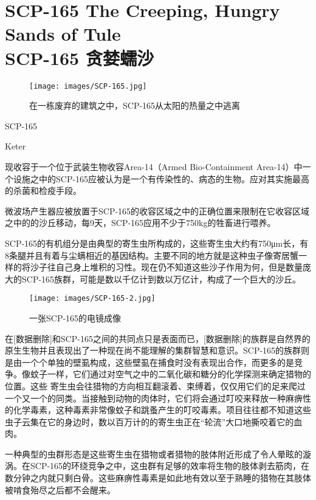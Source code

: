 \chapter[SCP-165 贪婪蠕沙]{
    SCP-165 The Creeping, Hungry Sands of Tule\\
    SCP-165 贪婪蠕沙
}

\label{chap:SCP-165}

\begin{figure}[H]
    \centering
    \texttt{[image: images/SCP-165.jpg]}
    \caption*{在一栋废弃的建筑之中，SCP-165从太阳的热量之中逃离}
\end{figure}

SCP-165

Keter

现收容于一个位于武装生物收容Area-14（Armed Bio-Containment Area-14）中一个设施之中的SCP-165应被认为是一个有传染性的、病态的生物。应对其实施最高的杀菌和检疫手段。

微波场产生器应被放置于SCP-165的收容区域之中的正确位置来限制在它收容区域之中的的沙丘移动，每9天，SCP-165应用不少于750kg的牲畜进行喂养。

\hr

SCP-165的有机组分是由典型的寄生虫所构成的，这些寄生虫大约有750μm长，有8条腿并且有着与尘螨相近的基因结构。主要不同的地方就是这种虫子像寄居蟹一样的将沙子往自己身上堆积的习性。现在仍不知道这些沙子作用为何，但是数量庞大的SCP-165族群，可能是数以千亿计到数以万亿计，构成了一个巨大的沙丘。

\begin{figure}[H]
    \centering
    \texttt{[image: images/SCP-165-2.jpg]}
    \caption*{一张SCP-165的电镜成像}
\end{figure}

在{[}数据删除]和SCP-165之间的共同点只是表面而已，{[}数据删除]的族群是自然界的原生生物并且表现出了一种现在尚不能理解的集群智慧和意识。SCP-165的族群则是由一个个单独的壁虱构成，这些壁虱在捕食时没有表现出合作，而更多的是竞争。像蚊子一样，它们通过对空气之中的二氧化碳和糖分的化学探测来确定猎物的位置。这些 寄生虫会往猎物的方向相互翻滚着、束缚着，仅仅用它们的足来爬过一个又一个的同类。当接触到动物的肉体时，它们将会通过叮咬来释放一种麻痹性的化学毒素，这种毒素非常像蚊子和跳蚤产生的叮咬毒素。项目往往都不知道这些虫子云集在它的身边时，数以百万计的的寄生虫正在“轮流”大口地撕咬着它的血肉。

一种典型的虫群形态是这些寄生虫在猎物或者猎物的肢体附近形成了令人晕眩的漩涡。在SCP-165的环绕竞争之中，这虫群有足够的效率将生物的肢体剥去筋肉，在数分钟之内就只剩白骨。这些麻痹性毒素是如此地有效以至于熟睡的猎物在其肢体被啃食殆尽之后都不会醒来。

